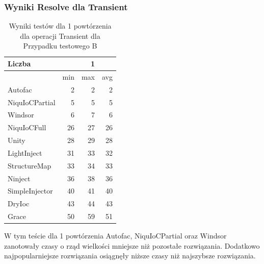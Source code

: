 \documentclass[12pt]{article}
\begin{document}
\subsubsection{Wyniki Resolve dla Transient}
\begin{table}[H]
\captionsetup{belowskip=0pt,aboveskip=0pt}
\begin{center}
\begin{small}
	\begin{tabular}{ | l | r r r | }
    		\hline
Liczba & & 1 & \\ \hline
 & min & max & avg \\ \hline
Autofac & 2 & 2 & 2 \\ \hline
NiquIoCPartial & 5 & 5 & 5 \\ \hline
Windsor & 6 & 7 & 6 \\ \hline
NiquIoCFull & 26 & 27 & 26 \\ \hline
Unity & 28 & 29 & 28 \\ \hline
LightInject & 31 & 33 & 32 \\ \hline
StructureMap & 33 & 34 & 33 \\ \hline
Ninject & 36 & 38 & 36 \\ \hline
SimpleInjector & 40 & 41 & 40 \\ \hline
DryIoc & 43 & 44 & 43 \\ \hline
Grace & 50 & 59 & 51 \\ \hline
  	\end{tabular}
\end{small}
\end{center}
\caption{Wyniki testów dla 1 powtórzenia dla operacji Transient dla Przypadku testowego B}
\label{TestCaseB_Transient1}
\end{table}
W tym teście dla 1 powtórzenia Autofac, NiquIoCPartial oraz Windsor zanotowały czasy o rząd wielkości mniejsze niż pozostałe rozwiązania. Dodatkowo najpopularniejsze rozwiązania osiągnęły niższe czasy niż najszybsze rozwiązania.
\\ \\
\end{document}
